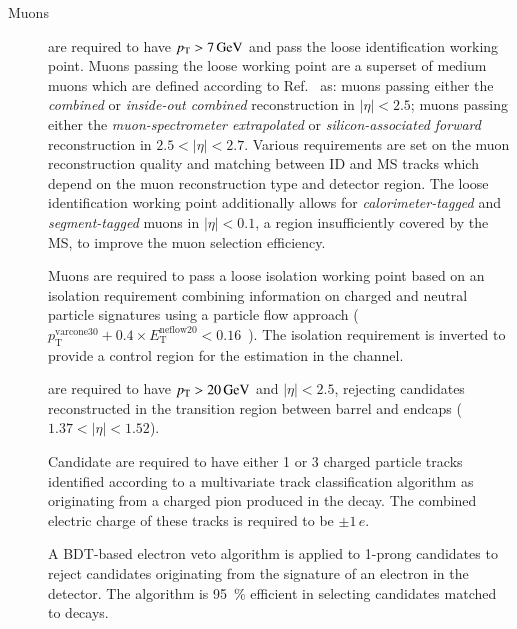 \begin{description}

\item[Muons] are required to have $\pT > \SI{7}{\GeV}$ and pass the
  loose identification working point. Muons passing the loose working
  point are a superset of medium muons which are defined according to
  Ref.~\cite{MUON-2018-03} as: muons passing either the
  \emph{combined} or \emph{inside-out combined} reconstruction in
  $|\eta| < 2.5$; muons passing either the \emph{muon-spectrometer
    extrapolated} or \emph{silicon-associated forward} reconstruction
  in $2.5 < |\eta| < 2.7$. Various requirements are set on the muon
  reconstruction quality and matching between ID and MS tracks which
  depend on the muon reconstruction type and detector region. The
  loose identification working point additionally allows for
  \emph{calorimeter-tagged} and \emph{segment-tagged} muons in
  $|\eta| < 0.1$, a region insufficiently covered by the MS, to
  improve the muon selection efficiency.

  Muons are required to pass a loose isolation working point based on
  an isolation requirement combining information on charged and
  neutral particle signatures using a particle flow approach
  ($p_{\text{T}}^{\text{varcone30}} + 0.4 \times
  E_{\text{T}}^{\text{neflow20}} < 0.16$~\cite{MUON-2018-03}). The
  isolation requirement is inverted to provide a control region for
  the \faketauhadvis estimation in the \lephad channel.




\item[\tauhadvis] are required to have $\pT > \SI{20}{\GeV}$ and
  $|\eta| < 2.5$, rejecting candidates reconstructed in the transition
  region between barrel and endcaps ($1.37 < |\eta| < 1.52$).

  Candidate \tauhadvis are required to have either 1 or 3 charged
  particle tracks identified according to a multivariate track
  classification algorithm as originating from a charged pion produced
  in the \taulepton decay. The combined electric charge of these
  tracks is required to be $\pm 1\,e$.

  A BDT-based electron veto algorithm is applied to 1-prong \tauhadvis
  candidates to reject candidates originating from the signature of an
  electron in the detector. The algorithm is \SI{95}{\percent}
  efficient in selecting \tauhadvis candidates matched to \tauhad
  decays.


\end{description}
